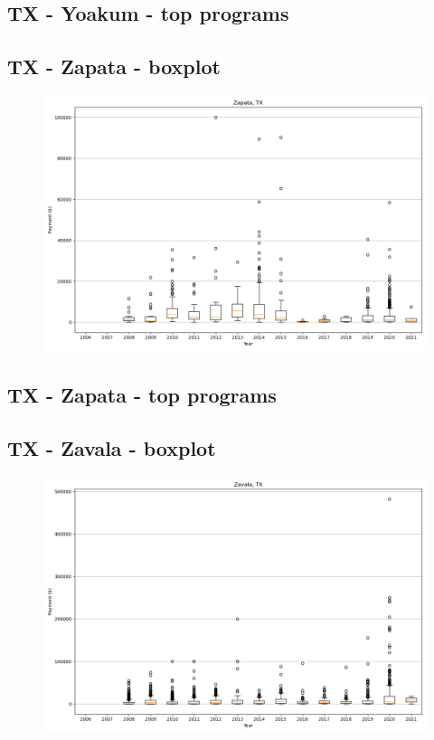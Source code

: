 \subsection*{TX - Yoakum - top programs}

\newpage
\subsection*{TX - Zapata - boxplot}
\begin{figure}[h]
\centering
\includegraphics[width=7in]{../output/boxplots/counties/Zapata-TX_boxplot.png}
\end{figure}


\subsection*{TX - Zapata - top programs}

\newpage
\subsection*{TX - Zavala - boxplot}
\begin{figure}[h]
\centering
\includegraphics[width=7in]{../output/boxplots/counties/Zavala-TX_boxplot.png}
\end{figure}


